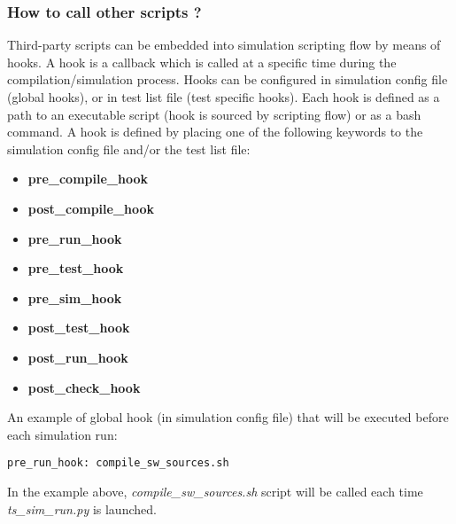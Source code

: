\documentclass{tropic_design_spec}
\begin{document}

\subsubsection{How to call other scripts ?}
\label{sec:how-to-call-other-scripts}

Third-party scripts can be embedded into simulation scripting flow by means of hooks.
A hook is a callback which is called at a specific time during the compilation/simulation process.
Hooks can be configured in simulation config file (global hooks), or in test list file
(test specific hooks). Each hook is defined as a path to an executable script (hook is
sourced by scripting flow) or as a bash command. A hook is defined by placing one of
the following keywords to the simulation config file and/or the test list file:
\begin{itemize}
    \item {\textbf{pre_compile_hook}}
    \item {\textbf{post_compile_hook}}
    \item {\textbf{pre_run_hook}}
    \item {\textbf{pre_test_hook}}
    \item {\textbf{pre_sim_hook}}
    \item {\textbf{post_test_hook}}
    \item {\textbf{post_run_hook}}
    \item {\textbf{post_check_hook}}
\end{itemize}

An example of global hook (in simulation config file) that will be executed before
each simulation run:

\begin{lstlisting}
pre_run_hook: compile_sw_sources.sh
\end{lstlisting}

In the example above, \textit{compile_sw_sources.sh} script will be called each time
\textit{ts_sim_run.py} is launched.
\end{document}
